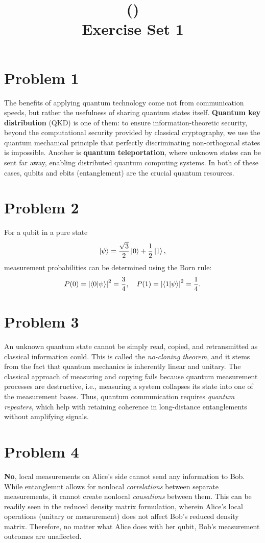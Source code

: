\documentclass[11pt]{article}
\title{\coursename (\coursecode)\\Exercise Set 1}
\author{\studentname}
\date{\semester}
\begin{document}
\maketitle

\section*{Problem 1}
The benefits of applying quantum technology come not from communication speeds,
but rather the usefulness of sharing quantum states itself.
\textbf{Quantum key distribution} (QKD) is one of them:
to ensure information-theoretic security,
beyond the computational security provided by classical cryptography,
we use the quantum mechanical principle that
perfectly discriminating non-orthogonal states is impossible.
Another is \textbf{quantum teleportation}, where unknown states can be sent far away,
enabling distributed quantum computing systems.
In both of these cases, qubits and ebits (entanglement) are the crucial quantum resources.

\section*{Problem 2}
For a qubit in a pure state
\[
    \ket{\psi} = \frac{\sqrt{3}}{2}\ket{0} + \frac{1}{2}\ket{1},
\]
measurement probabilities can be determined using the Born rule:
\[
    P(0) = \left|\braket{0|\psi}\right|^2 = \frac{3}{4},\quad
    P(1) = \left|\braket{1|\psi}\right|^2 = \frac{1}{4}.
\]

\section*{Problem 3}
An unknown quantum state cannot be simply read, copied, and retransmitted as classical information could.
This is called the \emph{no-cloning theorem}, and it stems from the fact that
quantum mechanics is inherently linear and unitary.
The classical approach of measuring and copying fails because
quantum measurement processes are destructive, i.e., measuring a system
collapses its state into one of the measurement bases.
Thus, quantum communication requires \emph{quantum repeaters},
which help with retaining coherence in long-distance entanglements without amplifying signals.

\section*{Problem 4}
\textbf{No}, local measurements on Alice's side cannot send any information to Bob.
While entanglemnt allows for nonlocal \emph{correlations} between separate measurements,
it cannot create nonlocal \emph{causations} between them.
This can be readily seen in the reduced density matrix formulation,
wherein Alice's local operations (unitary or measurement) does not affect Bob's reduced density matrix.
Therefore, no matter what Alice does with her qubit, Bob's measurement outcomes are unaffected.
\end{document}
